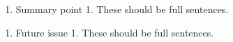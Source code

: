 \documentclass{ar-1col}
\begin{document}
\begin{summary}
  \begin{enumerate}
  \item Summary point 1. These should be full sentences.

  \end{enumerate}
\end{summary}

\begin{issues}
  \begin{enumerate}
  \item Future issue 1. These should be full sentences.
  \end{enumerate}
\end{issues}

\newpage


 

\clearpage



    
\end{document}
